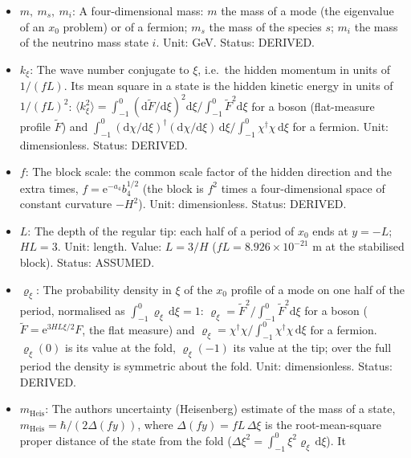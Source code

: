 \documentclass[
  10pt,
]{article}
\providecommand{\tightlist}{%
  \setlength{\itemsep}{0pt}\setlength{\parskip}{0pt}}
\begin{document}
\begin{itemize}
\tightlist
\item
  \(m,\ m_s,\ m_i\): A four-dimensional mass: \(m\) the mass of a mode
  (the eigenvalue of an \(x_0\) problem) or of a fermion; \(m_s\) the
  mass of the species \(s\); \(m_i\) the mass of the neutrino mass state
  \(i\). Unit: GeV. Status: DERIVED.
\item
  \(k_\xi\): The wave number conjugate to \(\xi\), i.e.~the hidden
  momentum in units of \(1/(fL)\). Its mean square in a state is the
  hidden kinetic energy in units of \(1/(fL)^2\):
  \(\langle k_\xi^2\rangle = \int_{-1}^{0}(\mathrm{d}\tilde F/\mathrm{d}\xi)^2\mathrm{d}\xi\big/\int_{-1}^{0}\tilde F^2\mathrm{d}\xi\)
  for a boson (flat-measure profile \(\tilde F\)) and
  \(\int_{-1}^{0}(\mathrm{d}\chi/\mathrm{d}\xi)^\dagger(\mathrm{d}\chi/\mathrm{d}\xi)\,\mathrm{d}\xi\big/\int_{-1}^{0}\chi^\dagger\chi\,\mathrm{d}\xi\)
  for a fermion. Unit: dimensionless. Status: DERIVED.
\item
  \(f\): The block scale: the common scale factor of the hidden
  direction and the extra times, \(f = \mathrm{e}^{-a_4}b_4^{1/2}\) (the
  block is \(f^2\) times a four-dimensional space of constant curvature
  \(-H^2\)). Unit: dimensionless. Status: DERIVED.
\item
  \(L\): The depth of the regular tip: each half of a period of \(x_0\)
  ends at \(y = -L\); \(HL = 3\). Unit: length. Value: \(L = 3/H\)
  (\(fL = 8.926\times10^{-21}\) m at the stabilised block). Status:
  ASSUMED.
\item
  \(\varrho_\xi\): The probability density in \(\xi\) of the \(x_0\)
  profile of a mode on one half of the period, normalised as
  \(\int_{-1}^{0}\varrho_\xi\,\mathrm{d}\xi = 1\):
  \(\varrho_\xi = \tilde F^2/\int_{-1}^{0}\tilde F^2\mathrm{d}\xi\) for
  a boson (\(\tilde F = \mathrm{e}^{3HL\xi/2}F\), the flat measure) and
  \(\varrho_\xi = \chi^\dagger\chi/\int_{-1}^{0}\chi^\dagger\chi\,\mathrm{d}\xi\)
  for a fermion. \(\varrho_\xi(0)\) is its value at the fold,
  \(\varrho_\xi(-1)\) its value at the tip; over the full period the
  density is symmetric about the fold. Unit: dimensionless. Status:
  DERIVED.
\item
  \(m_{\mathrm{Heis}}\): The author\textquotesingle s uncertainty
  (Heisenberg) estimate of the mass of a state,
  \(m_{\mathrm{Heis}} = \hbar/(2\Delta(fy))\), where
  \(\Delta(fy) = fL\,\Delta\xi\) is the root-mean-square proper distance
  of the state from the fold
  (\(\Delta\xi^2 = \int_{-1}^{0}\xi^2\varrho_\xi\,\mathrm{d}\xi\)). It

\end{itemize}
\end{document}
